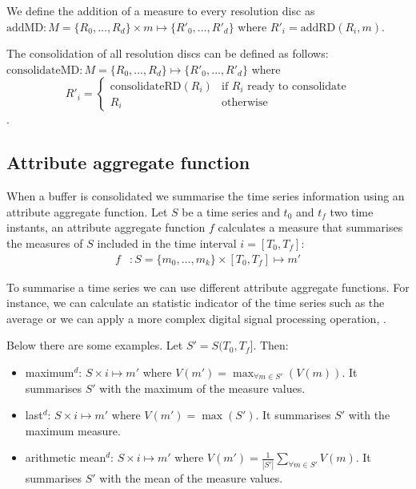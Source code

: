 We define the addition of a measure to every resolution disc as
$\text{addMD} : M=\{R_0, \dots, R_d\} \times m \mapsto \{R'_0, \dots,
R'_d\}$ where $R'_i=\text{addRD}(R_i,m)$.

The consolidation of all resolution discs can be defined as follows:
$\text{consolidateMD}: M=\{R_0, \dots, R_d\} \mapsto \{R'_0, \dots,
R'_d\}$ where
$$ 
R'_i = \begin{cases}
  \text{consolidateRD}(R_i) & \text{if } R_i \text{ ready to consolidate} \\
  R_i                       & \text{otherwise}
\end{cases}
$$.


\subsection{Attribute aggregate function}
\label{sec:model:interpolador}

When a buffer is consolidated we summarise the time series information
using an attribute aggregate function.  Let $S$ be a time series and
$t_0$ and $t_f$ two time instants, an attribute aggregate function $f$
calculates a measure that summarises the measures of $S$ included in
the time interval $i=[T_0,T_f]$:
\begin{align*}
f&:S=\{m_0,\ldots,m_k\} \times [T_0,T_f] \mapsto m'
\end{align*}

To summarise a time series we can use different attribute aggregate
functions.  For instance, we can calculate an statistic indicator of
the time series such as the average or we can apply a more complex
digital signal processing operation, \cite{zhang11}.

Below there are some examples. Let $S'=S(T_0,T_f]$. Then:
\begin{itemize}
\renewcommand{\labelitemi}{--}
\item maximum$^d$: $S \times i \mapsto m'$ where $V(m') =
  \max_{\forall m \in S'}(V(m))$. It summarises $S'$ with the maximum
  of the measure values.
\item last$^d$: $S \times i \mapsto m'$ where $V(m') = \max(S')$. It
  summarises $S'$ with the maximum measure.
\item arithmetic mean$^d$: $S \times i \mapsto m'$ where $V(m') =
  \frac{1}{|S'|} \sum\limits_{\forall m\in S'} V(m)$. It
  summarises $S'$ with the mean of the measure values.
\end{itemize}

